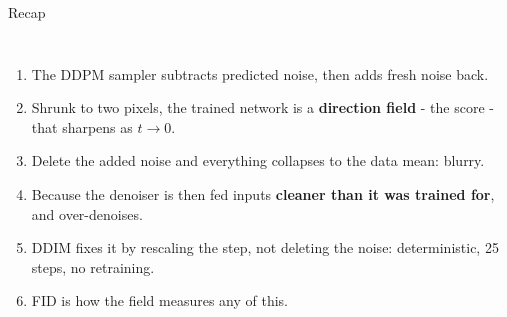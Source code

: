 \documentclass[aspectratio=169]{beamer}
\begin{document}
\begin{frame}{Recap}
  \small
  \begin{columns}[T]
    \begin{enumerate}\setlength\itemsep{2pt}
      \item The DDPM sampler subtracts predicted noise, then adds fresh noise back.
      \item Shrunk to two pixels, the trained network is a \textbf{direction field} -
        the score - that sharpens as $t\to 0$.
      \item Delete the added noise and everything collapses to the data mean: blurry.
      \item Because the denoiser is then fed inputs \textbf{cleaner than it was trained
        for}, and over-denoises.
      \item DDIM fixes it by rescaling the step, not deleting the noise: deterministic,
        25 steps, no retraining.
      \item FID is how the field measures any of this.
    \end{enumerate}
    \vskip 8pt
  \end{columns}
\end{frame}
\end{document}
